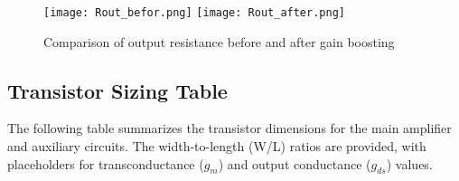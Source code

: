 \documentclass[a4paper,12pt]{article}
\begin{document}
\begin{figure}[H]
    \centering
    \texttt{[image: Rout\_befor.png]}
    \texttt{[image: Rout\_after.png]}
    \caption{Comparison of output resistance before and after gain boosting}
    \label{fig:rout_comparison}
\end{figure}

\pagebreak
\newpage

\subsection{Transistor Sizing Table}
The following table summarizes the transistor dimensions for the main amplifier and auxiliary circuits. The width-to-length (W/L) ratios are provided, with placeholders for transconductance ($g_m$) and output conductance ($g_{ds}$) values.
\end{document}
